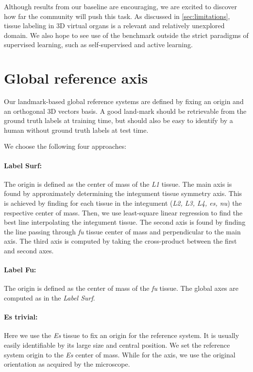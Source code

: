 \documentclass[10pt,twocolumn,letterpaper]{article}
\begin{document}
Although results from our baseline are encouraging, we are excited to discover how far the community will push this task. As discussed in \cref{sec:limitations}, tissue labeling in 3D virtual organs is a relevant and relatively unexplored domain. We also hope to see use of the benchmark outside the strict paradigms of supervised learning, such as self-supervised and active learning.
{\small


}

\clearpage
\appendix
\section{Global reference axis}
\label{suppl:sec1}
Our landmark-based global reference systems are defined by fixing an origin and an orthogonal 3D vectors basis. A good land-mark should be retrievable from the ground truth labels at training time, but should also be easy to identify by a human without ground truth labels at test time.

We choose the following four approaches: 

\paragraph{Label Surf:} The origin is defined as the center of mass of the \textit{L1} tissue. 
The main axis is found by approximately determining the integument tissue symmetry axis. This is achieved by finding for each tissue in the integument (\textit{L2, L3, L4, es, nu}) the respective center of mass. Then, we use least-square linear regression to find the best line interpolating the integument tissue. The second axis is found by finding the line passing through \textit{fu} tissue center of mass and perpendicular to the main axis. The third axis is computed by taking the cross-product between the first and second axes.

\paragraph{Label Fu:} The origin is defined as the center of mass of the \textit{fu} tissue. The global axes are computed as in the \textit{Label Surf}.

\paragraph{Es trivial:} Here we use the \textit{Es} tissue to fix an origin for the reference system. It is usually easily identifiable by its large size and central position. We set the reference system origin to the  \textit{Es} center of mass. While for the axis, we use the original orientation as acquired by the microscope. 
\end{document}
